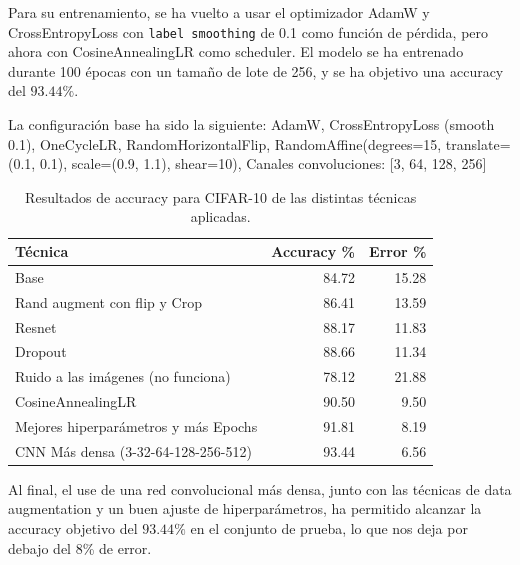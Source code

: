 \documentclass[11pt,spanish,listoffigures,listoftables]{tfgetsinf}
\begin{document}
Para su entrenamiento, se ha vuelto a usar el optimizador AdamW y CrossEntropyLoss con \texttt{label smoothing} de 0.1 como función de pérdida, pero ahora con CosineAnnealingLR como scheduler. El modelo se ha entrenado durante 100 épocas con un tamaño de lote de 256, y se ha objetivo una accuracy del $93.44\%$.

La configuración base ha sido la siguiente: AdamW, CrossEntropyLoss (smooth 0.1), OneCycleLR, RandomHorizontalFlip, RandomAffine(degrees=15, translate=(0.1, 0.1), scale=(0.9, 1.1), shear=10), Canales convoluciones: [3, 64, 128, 256]

\begin{table}[H]
\centering
\begin{tabular}{lrr}
	\toprule
	\textbf{Técnica} & \textbf{Accuracy \%} & \textbf{Error \%} \\
	\midrule
	Base & 84.72 & 15.28 \\
	\midrule
	Rand augment con flip y Crop & 86.41 & 13.59 \\
	Resnet & 88.17 & 11.83 \\
	Dropout & 88.66 & 11.34 \\
	Ruido a las imágenes (no funciona) & 78.12 & 21.88 \\
	CosineAnnealingLR & 90.50 & 9.50 \\
	Mejores hiperparámetros y más Epochs & 91.81 & 8.19 \\
	CNN Más densa (3-32-64-128-256-512) & 93.44 & 6.56 \\
	\bottomrule
\end{tabular}
\caption{Resultados de accuracy para CIFAR-10 de las distintas técnicas aplicadas.}
\label{tab:accuracy_ej2}
\end{table}


Al final, el use de una red convolucional más densa, junto con las técnicas de data augmentation y un buen ajuste de hiperparámetros, ha permitido alcanzar la accuracy objetivo del $93.44\%$ en el conjunto de prueba, lo que nos deja por debajo del 8\% de error.

\cleardoublepage
\printbibliography

\end{document}
